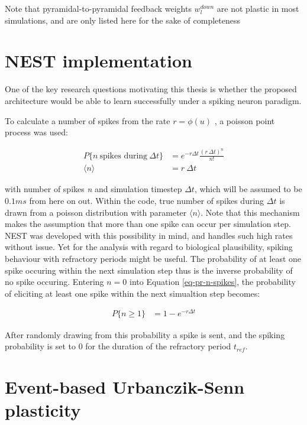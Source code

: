 Note that pyramidal-to-pyramidal feedback weights $w_l^{down}$ are not plastic in most simulations, and are only listed
here for the sake of completeness 



\section{NEST implementation}

One of the key research questions motivating this thesis is whether the proposed architecture would be able to
learn successfully under a spiking neuron paradigm. 


To calculate a number of spikes from the rate $r = \phi(u)$
, a poisson point process was used:

\begin{align}
  P\{\textit{n} \ \text{spikes during} \ \Delta t\} & = e^{-r \Delta t} \frac{(r \ \Delta t) ^ n}{n!}\label{eq-pr-n-spikes} \\
  \langle \textit{n} \rangle                        & = r \ \Delta t
\end{align}

with number of spikes \textit{n} and simulation timestep $\Delta t$, which will be assumed to be $0.1 ms$ from here
on out. Within the code, true number of spikes during $\Delta t$ is drawn from a poisson distribution with parameter
$\langle n \rangle$.
Note that this mechanism makes the assumption that more than one spike can occur per simulation step. NEST was
developed with this possibility in mind, and handles such high rates without issue. Yet for the analysis with regard to
biological plausibility, spiking behaviour with refractory periods might be useful. The probability of at least
one spike occuring within the next simulation step thus is the inverse probability of no spike occuring. Entering $n=0$
into Equation \ref{eq-pr-n-spikes}, the probability of eliciting at least one spike within the next simualtion step
becomes:

\begin{align}
  P\{ \textit{n} \geq 1\} & = 1 - e^{-r \Delta t}
\end{align}


After randomly drawing from this probability a spike is sent, and the spiking probability is set to 0 for the duration
of the refractory period $t_{ref}$.

\section{Event-based Urbanczik-Senn plasticity}

